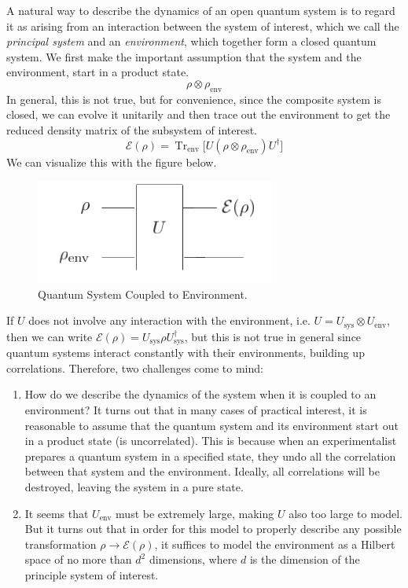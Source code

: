 \documentclass{article}
\DeclareMathOperator{\Tr}{Tr}
\begin{document}
    A natural way to describe the dynamics of an open quantum system is to regard it as arising from an interaction between the system of interest, which we call the \textit{principal system} and an \textit{environment}, which together form a closed quantum system. We first make the important assumption that the system and the environment, start in a product state. 
    \begin{equation}
      \rho \otimes \rho_{\mathrm{env}}
    \end{equation}
    In general, this is not true, but for convenience, since the composite system is closed, we can evolve it unitarily and then trace out the environment to get the reduced density matrix of the subsystem of interest. 
    \begin{equation}
      \mathcal{E}(\rho) = \Tr_{\mathrm{env}} \big[ U (\rho \otimes \rho_{\mathrm{env}}) U^\dagger \big]
    \end{equation}
    We can visualize this with the figure below. 
    \begin{figure}[H]
      \centering 
      \includegraphics[scale=0.6]{img/quantum_system_environment.png}
      \caption{Quantum System Coupled to Environment.} 
      \label{fig:quantum_system_environment}
    \end{figure}

    If $U$ does not involve any interaction with the environment, i.e. $U = U_{\mathrm{sys}} \otimes U_{\mathrm{env}}$, then we can write $\mathcal{E} (\rho) = U_{\mathrm{sys}} \rho U_{\mathrm{sys}}^\dagger$, but this is not true in general since quantum systems interact constantly with their environments, building up correlations. Therefore, two challenges come to mind: 
    \begin{enumerate}
      \item How do we describe the dynamics of the system when it is coupled to an environment? It turns out that in many cases of practical interest, it is reasonable to assume that the quantum system and its environment start out in a product state (is uncorrelated). This is because when an experimentalist prepares a quantum system in a specified state, they undo all the correlation between that system and the environment. Ideally, all correlations will be destroyed, leaving the system in a pure state. 
      \item It seems that $U_{\mathrm{env}}$ must be extremely large, making $U$ also too large to model. But it turns out that in order for this model to properly describe any possible transformation $\rho \rightarrow \mathcal{E}(\rho)$, it suffices to model the environment as a Hilbert space of no more than $d^2$ dimensions, where $d$ is the dimension of the principle system of interest. 
    \end{enumerate}
\end{document}
